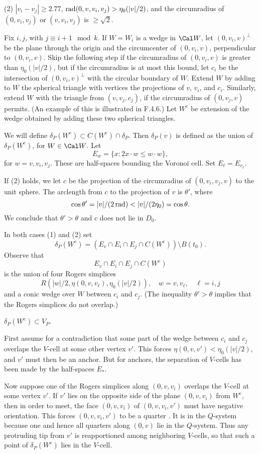 \noindent(2) $|v_i-v_j|\ge 2.77$, 
	$\operatorname{rad}(0,v,v_i,v_j)> \eta_0(|v|/2)$, and the
	circumradius of $(0,v_i,v_j)$ or $(v,v_i,v_j)$ is 
	$\ge\sqrt2$.

Fix $i,j$, with $j\equiv i+1\mod k$.
If $W = W_i$ is a wedge in $\Cal W$, let $(0,v_i,v)^\perp$ be
the plane through the origin and the circumcenter of $(0,v_i,v)$, perpendicular
to $(0,v_i,v)$.  Skip the following step if the circumradius
of $(0,v_i,v)$ is greater than $\eta_0(|v|/2)$, but if the circumradius
is at most this bound, let $c_i$ be the intersection of $(0,v_i,v)^\perp$
with the circular boundary of $W$.  Extend $W$ by adding to $W$ the
spherical triangle with vertices the projections of
$v$, $v_i$, and $c_i$.  Similarly, extend $W$ with the
triangle from $(v,v_j,c_j)$, if the circumradius of $(0,v_j,v)$ permits.
(An example of this is illustrated in F.4.6.)  Let $W^e$ be extension
of the wedge obtained by adding these two spherical triangles.

We will define $\delta_P(W^e)\subset C(W^e)\cap \delta_P$.  Then
$\delta_P(v)$ is defined as the union of $\delta_P(W^e)$, for $W\in\Cal W$.
Let 
$$E_w = \{x : 2 x\cdot w \le w\cdot w\},$$
for $w = v,v_i,v_j$.  These are half-spaces bounding the Voronoi cell.
Set $E_\ell = E_{v_\ell}$.

If (2) holds, we let $c$ be the projection of the circumradius of
$(0,v_i,v_j,v)$ to the unit sphere.  The arclength from
$c$ to the projection of $v$ is $\theta'$, where
$$\cos\theta' = |v|/(2\rad)<|v|/(2\eta_0) = \cos\theta.$$
We conclude that $\theta'>\theta$ and $c$
does not lie in $D_0$.

In both cases (1) and (2) set
$$\delta_P(W^e) = (E_v\cap E_i\cap E_j \cap C(W^e))\setminus B(t_0).$$
Observe that 
$$E_v\cap E_i\cap E_j \cap C(W^e)$$
is the union of four Rogers simplices
$$R(|w|/2,\eta(0,v,v_\ell),\eta_0(|v|/2)),\quad w = v,v_\ell,\quad
	\ell = i,j$$
and a conic wedge over $W$ between $c_i$ and $c_j$.
(The inequality $\theta'>\theta$ implies that
the Rogers simplices do not overlap.)

  $\delta_P(W^e)\subset V_P$.
\endproclaim

 First assume for a contradiction that
some part of the wedge between $c_i$ and $c_j$ overlaps
the $V$-cell at some other vertex $v'$.  This forces
$\eta(0,v,v')<\eta_0(|v|/2)$, and $v'$ must then be an anchor.
But for anchors, the separation of $V$-cells
has been made 
by the half-spaces $E_*$.

Now suppose one of the Rogers simplices along $(0,v,v_i)$ overlaps
the $V$-cell at some vertex $v'$.  If $v'$ lies on the opposite
side of the plane $(0,v,v_i)$ from $W^e$, then in order to meet, the
face $(0,v,v_i)$ of $(0,v,v_i,v')$ must have negative orientation.  
This forces
$(0,v,v_i,v')$ to be a quarter \cite{F}.  
It is in the $Q$-system because one
and hence all quarters along $(0,v)$ lie in the $Q$-system.  Thus
any protruding tip from $v'$ is reapportioned among neighboring $V$-cells,
so that such a point of $\delta_P(W^e)$ lies in the $V$-cell.

